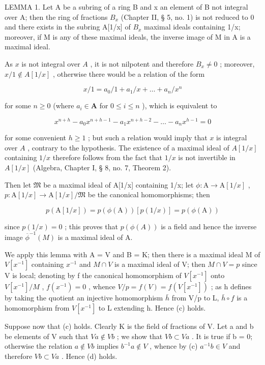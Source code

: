 LEMMA 1. Let A be a subring of a ring B and x an element of B not integral over A; then the ring of fractions \(B_{x}\) (Chapter II, § 5, no. 1) is not reduced to 0 and there exists in the subring A{[}1/x{]} of \(B_{x}\) maximal ideals containing 1/x; moreover, if M is any of these maximal ideals, the inverse image of M in A is a maximal ideal.

As \(x\) is not integral over \(A\) , it is not nilpotent and therefore \(B_x \neq 0\) ; moreover, \(x / 1 \notin A[1 / x]\) , otherwise there would be a relation of the form

\[
x / 1 = a _ {0} / 1 + a _ {1} / x + \dots + a _ {n} / x ^ {n}
\]

for some \(n \geqslant 0\) (where \(a_{i} \in \mathbf{A}\) for \(0 \leqslant i \leqslant n\) ), which is equivalent to

\[
x ^ {n + h} - a _ {0} x ^ {n + h - 1} - a _ {1} x ^ {n + h - 2} - \dots - a _ {n} x ^ {h - 1} = 0
\]

for some convenient \(h \geqslant 1\) ; but such a relation would imply that \(x\) is integral over \(A\) , contrary to the hypothesis. The existence of a maximal ideal of \(A[1/x]\) containing \(1/x\) therefore follows from the fact that \(1/x\) is not invertible in \(A[1/x]\) (Algebra, Chapter I, § 8, no. 7, Theorem 2).

Then let \(\mathfrak{M}\) be a maximal ideal of A{[}1/x{]} containing 1/x; let \(\phi: \mathrm{A} \to \mathrm{A}[1/x]\) , \(p: \mathrm{A}[1/x] \to \mathrm{A}[1/x]/\mathfrak{M}\) be the canonical homomorphisms; then

\[
p (\mathrm{A} [ 1 / x ]) = p (\phi (\mathrm{A})) [ p (1 / x) ] = p (\phi (\mathrm{A}))
\]

since \(p(1/x) = 0\) ; this proves that \(p(\phi(A))\) is a field and hence the inverse image \(\overline{\phi}^{-1}(M)\) is a maximal ideal of A.

We apply this lemma with A = V and B = K; then there is a maximal ideal M of \(V[x^{-1}]\) containing \(x^{-1}\) and \(M \cap V\) is a maximal ideal of V; then \(M \cap V = p\) since V is local; denoting by f the canonical homomorphism of \(V[x^{-1}]\) onto \(V[x^{-1}] / M\) , \(f(x^{-1}) = 0\) , whence \(V / p = f(V) = f(V[x^{-1}])\) ; as h defines by taking the quotient an injective homomorphism \(\bar{h}\) from V/p to L, \(\bar{h} \circ f\) is a homomorphism from \(V[x^{-1}]\) to L extending h. Hence (c) holds.

Suppose now that (c) holds. Clearly K is the field of fractions of V. Let a and b be elements of V such that \(Va \notin Vb\) ; we show that \(Vb \subset Va\) . It is true if b = 0; otherwise the relation \(a \notin Vb\) implies \(b^{-1}a \notin V\) , whence by (c) \(a^{-1}b \in V\) and therefore \(Vb \subset Va\) . Hence (d) holds.

